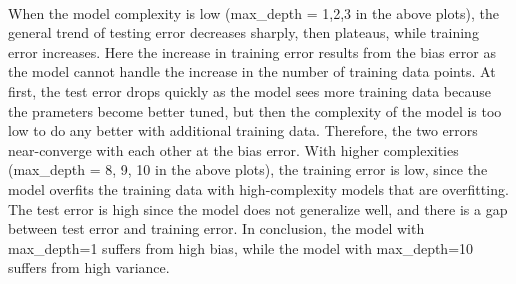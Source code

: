 \documentclass{article}
\begin{document}
    \begin{center}
    \end{center}
    { \hspace*{\fill} \\}
    
    When the model complexity is low (max\_depth = 1,2,3 in the above
plots), the general trend of testing error decreases sharply, then
plateaus, while training error increases. Here the increase in training
error results from the bias error as the model cannot handle the
increase in the number of training data points. At first, the test error
drops quickly as the model sees more training data because the prameters
become better tuned, but then the complexity of the model is too low to
do any better with additional training data. Therefore, the two errors
near-converge with each other at the bias error. With higher
complexities (max\_depth = 8, 9, 10 in the above plots), the training
error is low, since the model overfits the training data with
high-complexity models that are overfitting. The test error is high
since the model does not generalize well, and there is a gap between
test error and training error. In conclusion, the model with
max\_depth=1 suffers from high bias, while the model with max\_depth=10
suffers from high variance.
\end{document}
